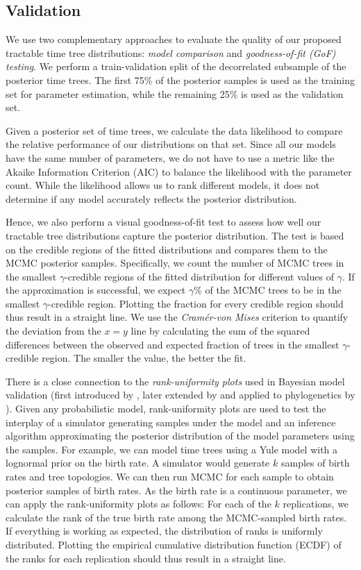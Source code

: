 \documentclass[10pt,letterpaper]{article}
\begin{document}
\subsection*{Validation}

We use two complementary approaches to evaluate the quality of our proposed tractable time tree distributions: \emph{model comparison} and \emph{goodness-of-fit (GoF) testing}. We perform a train-validation split of the decorrelated subsample of the posterior time trees. The first 75\% of the posterior samples is used as the training set for parameter estimation, while the remaining 25\% is used as the validation set.

Given a posterior set of time trees, we calculate the data likelihood to compare the relative performance of our distributions on that set. Since all our models have the same number of parameters, we do not have to use a metric like the Akaike Information Criterion (AIC) to balance the likelihood with the parameter count. While the likelihood allows us to rank different models, it does not determine if any model accurately reflects the posterior distribution.

Hence, we also perform a visual goodness-of-fit test to assess how well our tractable tree distributions capture the posterior distribution. The test is based on the credible regions of the fitted distributions and compares them to the MCMC posterior samples. Specifically, we count the number of MCMC trees in the smallest $\gamma$-credible regions of the fitted distribution for different values of $\gamma$. If the approximation is successful, we expect $\gamma$\% of the MCMC trees to be in the smallest $\gamma$-credible region. Plotting the fraction for every credible region should thus result in a straight line. We use the \emph{Cramér-von Mises} criterion \cite{cramarvonmises} to quantify the deviation from the $x=y$ line by calculating the sum of the squared differences between the observed and expected fraction of trees in the smallest $\gamma$-credible region. The smaller the value, the better the fit.

There is a close connection to the \emph{rank-uniformity plots} used in Bayesian model validation (first introduced by \cite{cook2006validation}, later extended by \cite{talts2018validating} and applied to phylogenetics by \cite{bayesianmodelvalidation}). Given any probabilistic model, rank-uniformity plots are used to test the interplay of a simulator generating samples under the model and an inference algorithm approximating the posterior distribution of the model parameters using the samples. For example, we can model time trees using a Yule model with a lognormal prior on the birth rate. A simulator would generate $k$ samples of birth rates and tree topologies. We can then run MCMC for each sample to obtain posterior samples of birth rates. As the birth rate is a continuous parameter, we can apply the rank-uniformity plots as follows: For each of the $k$ replications, we calculate the rank of the true birth rate among the MCMC-sampled birth rates. If everything is working as expected, the distribution of ranks is uniformly distributed. Plotting the empirical cumulative distribution function (ECDF) of the ranks for each replication should thus result in a straight line.
\end{document}
